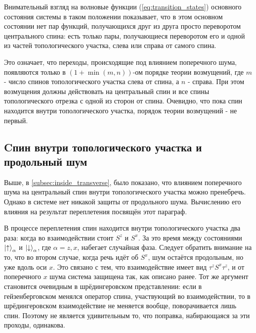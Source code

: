 \documentclass[a4paper,12pt]{article}
\theoremstyle{plain} %
\theoremstyle{definition} %
\theoremstyle{remark} %
\begin{document}
Внимательный взгляд на волновые функции (\ref{eq:transition_states}) основного состояния системы в таком положении показывает, что в этом основном состоянии нет пар функций, получающихся друг из друга просто переворотом центрального спина: есть только пары, получающиеся переворотом его и одной из частей топологического участка, слева или справа от самого спина.

Это означает, что переходы, происходящие под влиянием поперечного шума, появляются только в $(1 + \min(m,n))$-ом порядке теории возмущений, где $m$ - число спинов топологического участка слева от спина, а $n$ - справа. 
При этом возмущения должны действовать на центральный спин и все спины топологического отрезка с одной из сторон от спина.
Очевидно, что пока спин находится внутри топологического участка, порядок теории возмущений - не первый.

\subsection{Cпин внутри топологического участка и продольный шум} \label{subsec:inside_longitudinal}

Выше, в \ref{subsec:inside_transverse}, было показано, что влиянием поперечного шума на центральный спин внутри топологического участка можно пренебречь. Однако в системе нет никакой защиты от продольного шума. Вычислению его влияния на результат переплетения посвящён этот параграф.

В процессе переплетения спин находится внутри топологического участка два раза: когда во взаимодействии стоит $S^z$ и $S^x$.
За это время между состояниями $\ket{\uparrow}_\alpha$ и $\ket{\downarrow}_\alpha$, где $\alpha = z, x$, набегает случайная фаза.
Следует обратить внимание на то, что во втором случае, когда речь идёт об $S^x$, шум остаётся продольным, но уже вдоль оси $x$. 
Это связано с тем, что взаимодействие имеет вид $\tau^z S^x \tau^z$, и от поперечного $x$ шума система защищена так, как описано ранее. 
Тот же аргумент становится очевидным в шрёдингеровском представлении: если в гейзенберговском менялся оператор спина, участвующий во взаимодействии, то в шрёдингеровском взаимодействие не меняется вообще, поворачивается лишь спин.
Поэтому не является удивительным то, что поправка, набирающаяся за эти проходы, одинакова.
\end{document}
